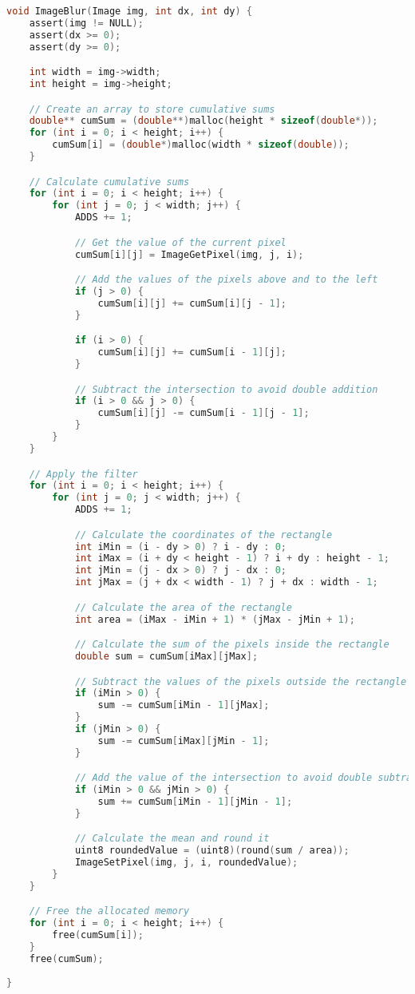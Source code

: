 \documentclass{report}
\begin{document}
\begingroup
\begin{lstlisting}[language=C]
  void ImageBlur(Image img, int dx, int dy) {
    assert(img != NULL);
    assert(dx >= 0);
    assert(dy >= 0);

    int width = img->width;
    int height = img->height;

    // Create an array to store cumulative sums
    double** cumSum = (double**)malloc(height * sizeof(double*));
    for (int i = 0; i < height; i++) {
        cumSum[i] = (double*)malloc(width * sizeof(double));
    }

    // Calculate cumulative sums
    for (int i = 0; i < height; i++) {
        for (int j = 0; j < width; j++) {
            ADDS += 1;

            // Get the value of the current pixel
            cumSum[i][j] = ImageGetPixel(img, j, i);

            // Add the values of the pixels above and to the left
            if (j > 0) {
                cumSum[i][j] += cumSum[i][j - 1];
            }

            if (i > 0) {
                cumSum[i][j] += cumSum[i - 1][j];
            }

            // Subtract the intersection to avoid double addition
            if (i > 0 && j > 0) {
                cumSum[i][j] -= cumSum[i - 1][j - 1];
            }
        }
    }

    // Apply the filter
    for (int i = 0; i < height; i++) {
        for (int j = 0; j < width; j++) {
            ADDS += 1;

            // Calculate the coordinates of the rectangle
            int iMin = (i - dy > 0) ? i - dy : 0;
            int iMax = (i + dy < height - 1) ? i + dy : height - 1;
            int jMin = (j - dx > 0) ? j - dx : 0;
            int jMax = (j + dx < width - 1) ? j + dx : width - 1;

            // Calculate the area of the rectangle
            int area = (iMax - iMin + 1) * (jMax - jMin + 1);

            // Calculate the sum of the pixels inside the rectangle
            double sum = cumSum[iMax][jMax];

            // Subtract the values of the pixels outside the rectangle
            if (iMin > 0) {
                sum -= cumSum[iMin - 1][jMax];
            }
            if (jMin > 0) {
                sum -= cumSum[iMax][jMin - 1];
            }

            // Add the value of the intersection to avoid double subtraction
            if (iMin > 0 && jMin > 0) {
                sum += cumSum[iMin - 1][jMin - 1];
            }

            // Calculate the mean and round it
            uint8 roundedValue = (uint8)(round(sum / area));
            ImageSetPixel(img, j, i, roundedValue);
        }
    }

    // Free the allocated memory
    for (int i = 0; i < height; i++) {
        free(cumSum[i]);
    }
    free(cumSum);
    
}
\end{lstlisting}
\endgroup
\end{document}
